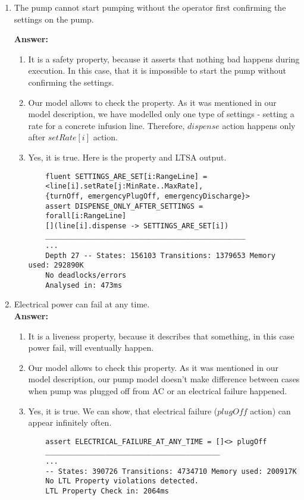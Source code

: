 \documentclass{article}
\begin{document}
\begin{enumerate}
    \item The pump cannot start pumping without the operator first confirming the settings on the pump.
    
    \textbf{Answer:}
    \begin{enumerate}
    \item It is a safety property, because it asserts that nothing bad happens during execution. In this case, that it is
    impossible to start the pump without confirming the settings.
    \item  Our model allows to check the property. As it was mentioned in our model description, we have modelled only one
    type of settings - setting a rate for a concrete infusion line. Therefore, $dispense$ action happens only after
    $setRate[i]$ action.
    \item Yes, it is true. Here is the property and LTSA output.
	\begin{verbatim}
	fluent SETTINGS_ARE_SET[i:RangeLine] = 
	<line[i].setRate[j:MinRate..MaxRate], 
	{turnOff, emergencyPlugOff, emergencyDischarge}>
	assert DISPENSE_ONLY_AFTER_SETTINGS =
	forall[i:RangeLine] 
	[](line[i].dispense -> SETTINGS_ARE_SET[i])
	_______________________________________________
	...
	Depth 27 -- States: 156103 Transitions: 1379653 Memory used: 292890K
	No deadlocks/errors
	Analysed in: 473ms
	\end{verbatim}    
    \end{enumerate}
    
    \item Electrical power can fail at any time.\\
    \textbf{Answer:}
    \begin{enumerate}
    \item It is a liveness property, because it describes that something, in this case power fail, will eventually happen.
    \item Our model allows to check this property. As it was mentioned in our model description, our pump model doesn't make
    difference between cases when pump was plugged off from AC or an electrical failure happened.
    \item Yes, it is true. We can show, that electrical failure ($plugOff$ action) can appear infinitely often.
    \begin{verbatim}
    assert ELECTRICAL_FAILURE_AT_ANY_TIME = []<> plugOff
    _________________________________________
    ...
    -- States: 390726 Transitions: 4734710 Memory used: 200917K
    No LTL Property violations detected.
    LTL Property Check in: 2064ms
    \end{verbatim}
    \end{enumerate}
     


\end{enumerate}
\end{document}

